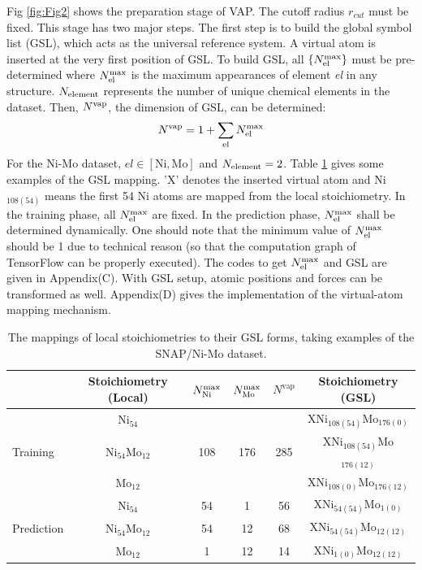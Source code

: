 \documentclass[final,1p,times]{elsarticle}
\begin{document}
Fig \ref{fig:Fig2} shows the preparation stage of VAP. The cutoff radius 
$r_{cut}$ must be fixed. This stage has two major steps. The first step is to 
build the global symbol list (GSL), which acts as the universal reference 
system. A virtual atom is inserted at the very first position of GSL. 
To build GSL, all $\{N^{\mathrm{max}}_{\mathrm{el}}\}$ must be pre-determined where $N^{\mathrm{max}}_{\mathrm{el}}$ is the 
maximum appearances of element \textit{el} in any structure. $N_{\mathrm{element}}$ represents 
the number of unique chemical elements in the dataset. Then, $N^{\mathrm{vap}}$, the 
dimension of GSL, can be determined:
\begin{equation}
\label{eq:n_vap}
N^{\mathrm{vap}} = 1 + \sum_{\mathrm{el}}{N^{\mathrm{max}}_{\mathrm{el}}}
\end{equation}
For the Ni-Mo dataset, $el \in [\mathrm{Ni}, \mathrm{Mo}]$ and 
$N_{\mathrm{element}} = 2$. 
Table \ref{table:GSL} gives some examples of the GSL mapping. 'X' denotes the 
inserted virtual atom and Ni$_{108(54)}$ means the first 54 Ni atoms are mapped 
from the local stoichiometry. In the training phase, all $N^{\mathrm{max}}_{\mathrm{el}}$ are fixed.
In the prediction phase, $N^{\mathrm{max}}_{\mathrm{el}}$ shall be determined dynamically. One should 
note that the minimum value of $N^{\mathrm{max}}_{\mathrm{el}}$ should be 1 due to technical reason (so 
that the computation graph of TensorFlow can be properly executed). The codes to
get $N^{\mathrm{max}}_{\mathrm{el}}$ and GSL are given in Appendix(C). With GSL setup, atomic positions
and forces can be transformed as well. Appendix(D) gives the implementation of 
the virtual-atom mapping mechanism. 

% 
%
\begin{table}[h]
\centering
\begin{tabular}{lccccc}
\hline
 & Stoichiometry (Local) & $N^{\mathrm{max}}_{\mathrm{Ni}}$ & $N^{\mathrm{max}}_{\mathrm{Mo}}$ & $N^{\mathrm{vap}}$ 
 & Stoichiometry (GSL) \\
\hline
 & Ni$_{54}$ &  &  &  & XNi$_{108(54)}$Mo$_{176(0)}$ \\
Training & Ni$_{54}$Mo$_{12}$ & 108 & 176 & 285 
 & XNi$_{108(54)}$Mo$_{176(12)}$ \\
 & Mo$_{12}$ &  &  &  & XNi$_{108(0)}$Mo$_{176(12)}$ \\
\hline
 & Ni$_{54}$ & 54 & 1 & 56 & XNi$_{54(54)}$Mo$_{1(0)}$ \\
Prediction & Ni$_{54}$Mo$_{12}$ & 54 & 12 & 68 & XNi$_{54(54)}$Mo$_{12(12)}$ \\
 & Mo$_{12}$ & 1 & 12 & 14 & XNi$_{1(0)}$Mo$_{12(12)}$ \\
\hline
\end{tabular}
\caption{\label{table:GSL}
The mappings of local stoichiometries to their GSL forms, taking examples of the 
SNAP/Ni-Mo dataset.
}
\end{table}
\end{document}
